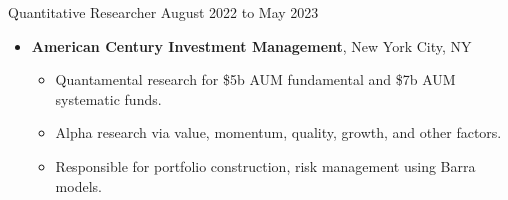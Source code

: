 \documentclass[11pt]{article}
\newenvironment{innerlist}[1][\enskip\textbullet]%
        {\begin{itemize}[#1,leftmargin=*,parsep=0pt,itemsep=0pt,topsep=0pt,partopsep=0pt]}
        {\end{itemize}}
\begin{document}
\vspace{2pt}

Quantitative Researcher \hfill{August 2022 to May 2023}
\begin{innerlist}
	\item[] \textbf{American Century Investment Management}, New York City, NY
	\begin{innerlist}
		\item Quantamental research for \$5b AUM fundamental and \$7b AUM systematic funds.
		\item Alpha research via value, momentum, quality, growth, and other factors.
		\item Responsible for portfolio construction, risk management using Barra models.
	\end{innerlist}
\end{innerlist}

\vspace{2pt}
\end{document}
